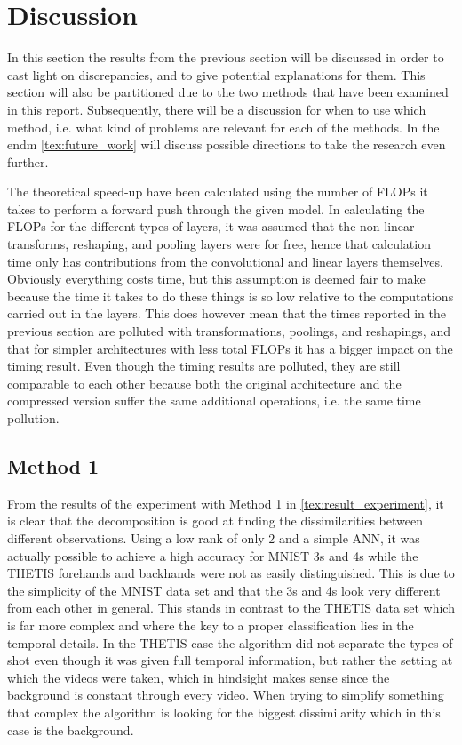 \section{Discussion} \label{tex:discussion}

In this section the results from the previous section will be discussed in order to cast light on discrepancies, and to give potential explanations for them. This section will also be partitioned due to the two methods that have been examined in this report. Subsequently, there will be a discussion for when to use which method, i.e. what kind of problems are relevant for each of the methods. In the endm \autoref{tex:future_work} will discuss possible directions to take the research even further.

The theoretical speed-up have been calculated using the number of FLOPs it takes to perform a forward push through the given model. In calculating the FLOPs for the different types of layers, it was assumed that the non-linear transforms, reshaping, and pooling layers were for free, hence that calculation time only has contributions from the convolutional and linear layers themselves. Obviously everything costs time, but this assumption is deemed fair to make because the time it takes to do these things is so low relative to the computations carried out in the layers. This does however mean that the times reported in the previous section are polluted with transformations, poolings, and reshapings, and that for simpler architectures with less total FLOPs it has a bigger impact on the timing result. Even though the timing results are polluted, they are still comparable to each other because both the original architecture and the compressed version suffer the same additional operations, i.e. the same time pollution.


\subsection{Method 1}
From the results of the experiment with Method 1 in \autoref{tex:result_experiment}, it is clear that the decomposition is good at finding the dissimilarities between different observations. Using a low rank of only 2 and a simple ANN, it was actually possible to achieve a high accuracy for MNIST 3s and 4s while the THETIS forehands and backhands were not as easily distinguished. This is due to the simplicity of the MNIST data set and that the 3s and 4s look very different from each other in general. This stands in contrast to the THETIS data set which is far more complex and where the key to a proper classification lies in the temporal details. In the THETIS case the algorithm did not separate the types of shot even though it was given full temporal information, but rather the setting at which the videos were taken, which in hindsight makes sense since the background is constant through every video. When trying to simplify something that complex the algorithm is looking for the biggest dissimilarity which in this case is the background.

